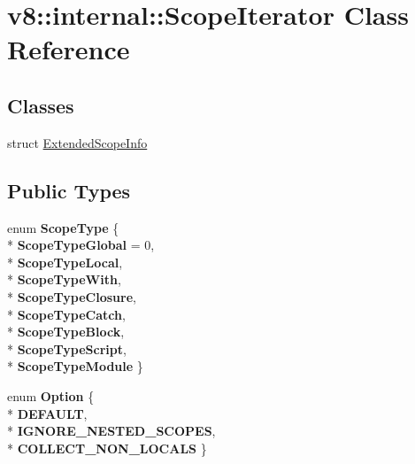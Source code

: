 \hypertarget{classv8_1_1internal_1_1_scope_iterator}{}\section{v8\+:\+:internal\+:\+:Scope\+Iterator Class Reference}
\label{classv8_1_1internal_1_1_scope_iterator}
\subsection*{Classes}
\begin{DoxyCompactItemize}
\item 
struct \hyperlink{structv8_1_1internal_1_1_scope_iterator_1_1_extended_scope_info}{Extended\+Scope\+Info}
\end{DoxyCompactItemize}
\subsection*{Public Types}
\begin{DoxyCompactItemize}
\item 
enum {\bfseries Scope\+Type} \{ \\*
{\bfseries Scope\+Type\+Global} = 0, 
\\*
{\bfseries Scope\+Type\+Local}, 
\\*
{\bfseries Scope\+Type\+With}, 
\\*
{\bfseries Scope\+Type\+Closure}, 
\\*
{\bfseries Scope\+Type\+Catch}, 
\\*
{\bfseries Scope\+Type\+Block}, 
\\*
{\bfseries Scope\+Type\+Script}, 
\\*
{\bfseries Scope\+Type\+Module}
 \}\hypertarget{classv8_1_1internal_1_1_scope_iterator_aa4aa3e4d41cb6ce47ec9df9a056fc49b}{}\label{classv8_1_1internal_1_1_scope_iterator_aa4aa3e4d41cb6ce47ec9df9a056fc49b}

\item 
enum {\bfseries Option} \{ \\*
{\bfseries D\+E\+F\+A\+U\+LT}, 
\\*
{\bfseries I\+G\+N\+O\+R\+E\+\_\+\+N\+E\+S\+T\+E\+D\+\_\+\+S\+C\+O\+P\+ES}, 
\\*
{\bfseries C\+O\+L\+L\+E\+C\+T\+\_\+\+N\+O\+N\+\_\+\+L\+O\+C\+A\+LS}
 \}\hypertarget{classv8_1_1internal_1_1_scope_iterator_a9127368b90641c8dea51ce83b2edf38d}{}\label{classv8_1_1internal_1_1_scope_iterator_a9127368b90641c8dea51ce83b2edf38d}

\end{DoxyCompactItemize}
